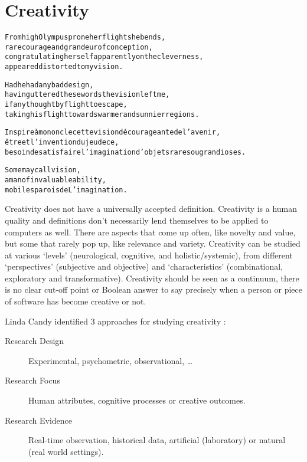 
\chapter{Creativity}
\label{ch:creativity}

\startcontents[chapters]

\vfill

\begin{alltt}\sffamily
From high Olympus prone her flight she bends,
rare courage and grandeur of conception,
congratulating herself apparently on the cleverness,
appeared distorted to my vision.

Had he had any bad design,
having uttered these words the vision left me,
if any thought by flight to escape,
taking his flight towards warmer and sunnier regions.

Inspire à mon oncle cette vision décourageante de l'avenir,
être et l'invention du jeu de ce,
besoin de satisfaire l'imagination d'objets rares ou grandioses.

Some may call vision,
a man of invaluable ability,
mobiles parois de L'imagination.
\end{alltt}

\newpage
\minicontents
\spirals

Creativity does not have a universally accepted definition. Creativity is a human quality and definitions don't necessarily lend themselves to be applied to computers as well. There are aspects that come up often, like novelty and value, but some that rarely pop up, like relevance and variety. Creativity can be studied at various `levels' (neurological, cognitive, and holistic/systemic), from different `perspectives' (subjective and objective) and `characteristics' (combinational, exploratory and transformative). Creativity should be seen as a continuum, there is no clear cut-off point or Boolean answer to say precisely when a person or piece of software has become creative or not.

Linda Candy identified 3 approaches for studying creativity \autocite*{Candy2012}:

\begin{description}
  \item [Research Design] Experimental, psychometric, observational, \ldots
  \item [Research Focus] Human attributes, cognitive processes or creative outcomes.
  \item [Research Evidence] Real-time observation, historical data, artificial (laboratory) or natural (real world settings).
\end{description}

